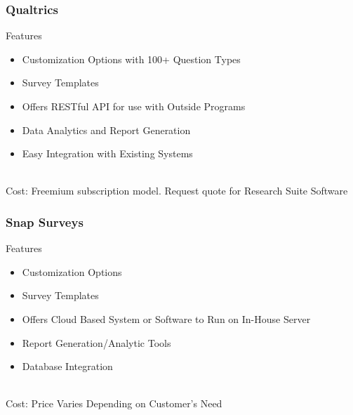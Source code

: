 \documentclass{beamer}
\begin{document}
	\begin{frame}
		\frametitle{Qualtrics}
		Features
		\begin{itemize}
			\item Customization Options with 100+ Question Types
			\item Survey Templates
			\item Offers RESTful API for use with Outside Programs
			\item Data Analytics and Report Generation
			\item Easy Integration with Existing Systems
		\end{itemize}
		~\\
		Cost: Freemium subscription model. Request quote for Research Suite Software
	\end{frame}
	
	\begin{frame}
		\frametitle{Snap Surveys}
		Features
		\begin{itemize}
			\item Customization Options
			\item Survey Templates
			\item Offers Cloud Based System or Software to Run on In-House Server
			\item Report Generation/Analytic Tools
			\item Database Integration
		\end{itemize}
		~\\
		Cost: Price Varies Depending on Customer's Need
	\end{frame}	
\end{document}
